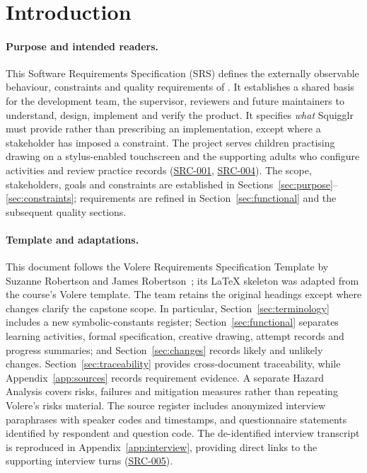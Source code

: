 \documentclass[12pt]{article}
\renewcommand{\_}{\textunderscore\allowbreak}%
\newcommand{\srcref}[1]{\hyperref[src:#1]{SRC-#1}}
\begin{document}
~\\


\clearpage
{}
\section*{Introduction}
\label{sec:introduction}

\paragraph{Purpose and intended readers.}
This Software Requirements Specification (SRS) defines the externally observable
behaviour, constraints and quality requirements of \progname. It establishes a
shared basis for the development team, the supervisor, reviewers and future
maintainers to understand, design, implement and verify the product. It
specifies \emph{what} Squigglr must provide rather than prescribing an
implementation, except where a stakeholder has imposed a constraint. The project
serves children practising drawing on a stylus-enabled touchscreen and the
supporting adults who configure activities and review practice records
(\srcref{001}, \srcref{004}). The scope, stakeholders, goals and constraints are
established in Sections~\ref{sec:purpose}--\ref{sec:constraints}; requirements
are refined in Section~\ref{sec:functional} and the subsequent quality sections.

\paragraph{Template and adaptations.}
This document follows the Volere Requirements Specification Template by Suzanne
Robertson and James Robertson~\cite{robertson2012volere}; its LaTeX skeleton was
adapted from the course's Volere template. The team retains the original
headings except where changes clarify the capstone scope. In particular,
Section~\ref{sec:terminology} includes a new symbolic-constants register;
Section~\ref{sec:functional} separates learning activities, formal
specification, creative drawing, attempt records and progress summaries; and
Section~\ref{sec:changes} records likely and unlikely changes.
Section~\ref{sec:traceability} provides cross-document traceability, while
Appendix~\ref{app:sources} records requirement evidence. A separate Hazard
Analysis covers risks, failures and mitigation measures rather than repeating
Volere's risks material. The source register includes anonymized interview
paraphrases with speaker codes and timestamps, and questionnaire statements
identified by respondent and question code. The de-identified interview
transcript is reproduced in Appendix~\ref{app:interview}, providing direct links
to the supporting interview turns (\srcref{005}).
\end{document}
